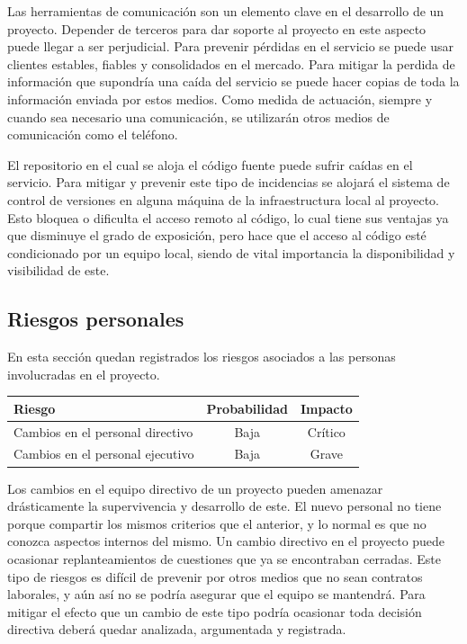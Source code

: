 Las herramientas de comunicación son un elemento clave en el desarrollo de un proyecto. Depender de terceros para dar soporte al proyecto en este aspecto puede llegar a ser perjudicial. Para 
prevenir pérdidas en el servicio se puede usar clientes estables, fiables y consolidados en el mercado. Para mitigar la perdida de información que supondría una caída del servicio se puede hacer
copias de toda la información enviada por estos medios. Como medida de actuación, siempre y cuando sea necesario una comunicación, se utilizarán otros medios de comunicación como el teléfono. 

El repositorio en el cual se aloja el código fuente puede sufrir caídas en el servicio. Para mitigar y prevenir este tipo de incidencias se alojará el sistema de control de versiones en alguna
máquina de la infraestructura local al proyecto. Esto bloquea o dificulta el acceso remoto al código, lo cual tiene sus ventajas ya que disminuye el grado de exposición, pero hace que el acceso 
al código esté condicionado por un equipo local, siendo de vital importancia la disponibilidad y visibilidad de este. 

\subsection{Riesgos personales}
En esta sección quedan registrados los riesgos asociados a las personas involucradas en el proyecto. 

\begin{tabular}{|l|c|c|} \hline
\textbf{Riesgo} & \textbf{Probabilidad} & \textbf{Impacto} \\ \hline
Cambios en el personal directivo & Baja & Crítico \\ \hline
Cambios en el personal ejecutivo & Baja & Grave \\ \hline
\end{tabular}

Los cambios en el equipo directivo de un proyecto pueden amenazar drásticamente la supervivencia y desarrollo de este. 
El nuevo personal no tiene porque compartir los mismos criterios que el anterior, y lo normal es que no conozca aspectos
internos del mismo. Un cambio directivo en el proyecto puede ocasionar replanteamientos de cuestiones que ya se encontraban cerradas.
Este tipo de riesgos es difícil de prevenir por otros medios que no sean contratos laborales, y aún así no se podría asegurar que el equipo se mantendrá. 
Para mitigar el efecto que un cambio de este tipo podría ocasionar toda decisión directiva deberá quedar analizada, argumentada y registrada. 

